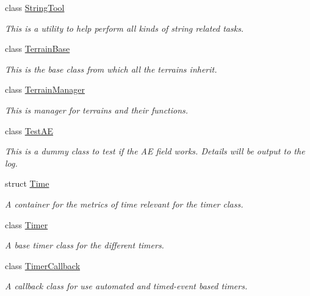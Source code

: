 \begin{DoxyCompactItemize}
class \hyperlink{classMezzanine_1_1StringTool}{StringTool}
\begin{DoxyCompactList}\small\item\em This is a utility to help perform all kinds of string related tasks. \item\end{DoxyCompactList}\item 
class \hyperlink{classMezzanine_1_1TerrainBase}{TerrainBase}
\begin{DoxyCompactList}\small\item\em This is the base class from which all the terrains inherit. \item\end{DoxyCompactList}\item 
class \hyperlink{classMezzanine_1_1TerrainManager}{TerrainManager}
\begin{DoxyCompactList}\small\item\em This is manager for terrains and their functions. \item\end{DoxyCompactList}\item 
class \hyperlink{classMezzanine_1_1TestAE}{TestAE}
\begin{DoxyCompactList}\small\item\em This is a dummy class to test if the AE field works. Details will be output to the log. \item\end{DoxyCompactList}\item 
struct \hyperlink{structMezzanine_1_1Time}{Time}
\begin{DoxyCompactList}\small\item\em A container for the metrics of time relevant for the timer class. \item\end{DoxyCompactList}\item 
class \hyperlink{classMezzanine_1_1Timer}{Timer}
\begin{DoxyCompactList}\small\item\em A base timer class for the different timers. \item\end{DoxyCompactList}\item 
class \hyperlink{classMezzanine_1_1TimerCallback}{TimerCallback}
\begin{DoxyCompactList}\small\item\em A callback class for use automated and timed-\/event based timers. \item\end{DoxyCompactList}\item 

\end{DoxyCompactItemize}
